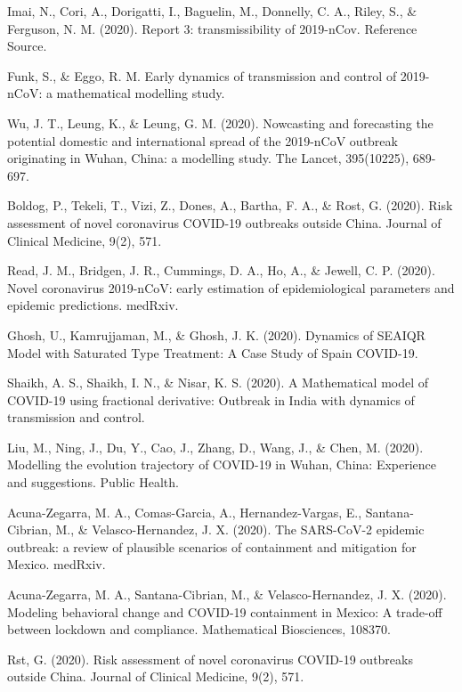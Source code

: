 \begin{thebibliography}{222}
   Imai, N., Cori, A., Dorigatti, I., Baguelin, M., Donnelly, C.
  A., Riley, S., \& Ferguson, N. M. (2020). Report 3: transmissibility of
  2019-nCov. Reference Source.

   Funk, S., \& Eggo, R. M. Early dynamics of transmission
  and control of 2019-nCoV: a mathematical modelling study.

   Wu, J. T., Leung, K., \& Leung, G. M. (2020). Nowcasting and
  forecasting the potential domestic and international spread of the 2019-nCoV
  outbreak originating in Wuhan, China: a modelling study. The Lancet,
  395(10225), 689-697.

   Boldog, P., Tekeli, T., Vizi, Z., Dones, A., Bartha, F. A., \&
  Rost, G. (2020). Risk assessment of novel coronavirus COVID-19 outbreaks
  outside China. Journal of Clinical Medicine, 9(2), 571.

   Read, J. M., Bridgen, J. R., Cummings, D. A., Ho, A., \&
  Jewell, C. P. (2020). Novel coronavirus 2019-nCoV: early estimation of
  epidemiological parameters and epidemic predictions. medRxiv.

   Ghosh, U., Kamrujjaman, M., \& Ghosh, J. K. (2020). Dynamics
  of SEAIQR Model with Saturated Type Treatment: A Case Study of Spain
  COVID-19.

   Shaikh, A. S., Shaikh, I. N., \& Nisar, K. S. (2020). A
  Mathematical model of COVID-19 using fractional derivative: Outbreak in
  India with dynamics of transmission and control.

   Liu, M., Ning, J., Du, Y., Cao, J., Zhang, D., Wang, J., \&
  Chen, M. (2020). Modelling the evolution trajectory of COVID-19 in Wuhan,
  China: Experience and suggestions. Public Health.

   Acuna-Zegarra, M. A., Comas-Garcia, A., Hernandez-Vargas,
  E., Santana-Cibrian, M., \& Velasco-Hernandez, J. X. (2020). The SARS-CoV-2
  epidemic outbreak: a review of plausible scenarios of containment and
  mitigation for Mexico. medRxiv.

   Acuna-Zegarra, M. A., Santana-Cibrian, M., \&
  Velasco-Hernandez, J. X. (2020). Modeling behavioral change and COVID-19
  containment in Mexico: A trade-off between lockdown and compliance.
  Mathematical Biosciences, 108370.

  Rst, G. (2020). Risk assessment of novel coronavirus COVID-19 outbreaks
  outside China. Journal of Clinical Medicine, 9(2), 571.


\end{thebibliography}
